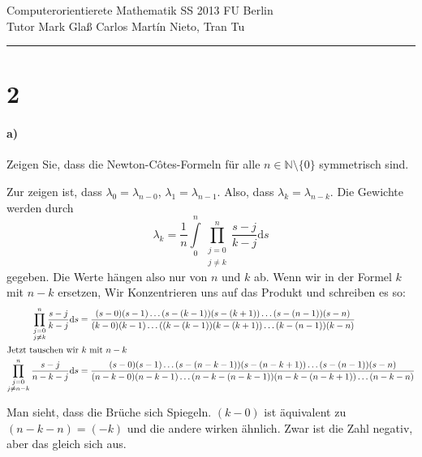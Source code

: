\documentclass[ngerman,a4paper]{scrartcl}
\newcommand{\N}{\ensuremath{\mathbb{N}}}
\begin{document}
{\sffamily
  \hfill
  Computerorientierete Mathematik SS 2013\hfill
  FU Berlin\\[8pt]
  \hfill Tutor Mark Glaß \hfill Carlos Martín Nieto, Tran Tu\hrule \bigskip
}

\section*{2}

\paragraph{a)}

Zeigen Sie, dass die Newton-Côtes-Formeln für alle
$n\in\N\setminus\{0\}$ symmetrisch sind.

Zur zeigen ist, dass $\lambda_0 = \lambda_{n-0}$, $\lambda_1 =
\lambda_{n-1}$. Also, dass $\lambda_k = \lambda_{n-k}$. Die Gewichte
werden durch
\[
\lambda_k = \frac{1}{n} \int\limits^n_0\prod^n_{\substack{j=0\\j\neq k}} \frac{s-j}{k-j}\text{d}s
\]
gegeben. Die Werte hängen also nur von $n$ und $k$ ab. Wenn wir in der
Formel $k$ mit $n-k$ ersetzen,  Wir Konzentrieren uns auf das Produkt und schreiben es so:
\begin{align*}
  \prod^n_{\substack{j=0\\j\neq k}} \frac{s-j}{k-j}\text{d}s &= \frac{(s-0)(s-1)\dots(s-(k-1))(s-(k+1))\dots(s-(n-1))(s-n)}
  {(k-0)(k-1)\dots((k-(k-1))(k-(k+1))\dots(k-(n-1))(k-n)}\\
  \intertext{Jetzt tauschen wir $k$ mit $n-k$}
  \prod^n_{\substack{j=0\\j\neq n-k}} \frac{s-j}{n-k-j}\text{d}s &= \frac{(s-0)(s-1)\dots(s-(n-k-1))(s-(n-k+1))\dots(s-(n-1))(s-n)}
  {(n-k-0)(n-k-1)\dots(n-k-(n-k-1))(n-k-(n-k+1))\dots(n-k-n)}
\end{align*}

Man sieht, dass die Brüche sich Spiegeln. $(k-0)$ ist äquivalent zu
$(n-k-n)=(-k)$ und die andere wirken ähnlich. Zwar ist die Zahl
negativ, aber das gleich sich aus.
\end{document}
